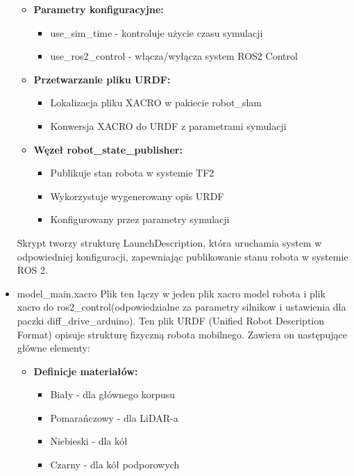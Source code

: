 \documentclass[a4paper,twoside,12pt]{book}
\begin{document}
\begin{itemize}
	\begin{itemize}
		\item \textbf{Parametry konfiguracyjne:}
			\begin{itemize}
				\item use\_sim\_time - kontroluje użycie czasu symulacji
				\item use\_ros2\_control - włącza/wyłącza system ROS2 Control
			\end{itemize}
		
		\item \textbf{Przetwarzanie pliku URDF:}
			\begin{itemize}
				\item Lokalizacja pliku XACRO w pakiecie robot\_slam
				\item Konwersja XACRO do URDF z parametrami symulacji
			\end{itemize}
		
		\item \textbf{Węzeł robot\_state\_publisher:}
			\begin{itemize}
				\item Publikuje stan robota w systemie TF2
				\item Wykorzystuje wygenerowany opis URDF
				\item Konfigurowany przez parametry symulacji
			\end{itemize}
	\end{itemize}

	Skrypt tworzy strukturę LaunchDescription, która uruchamia system w odpowiedniej konfiguracji, zapewniając publikowanie stanu robota w systemie ROS 2.
	\newpage
	\item model\_main.xacro
	Plik ten łączy w jeden plik xacro model robota i plik xacro do ros2\_control(odpowiedzialne za parametry silnikow i ustawienia dla paczki diff\_drive\_arduino).
	Ten plik URDF (Unified Robot Description Format) opisuje strukturę fizyczną robota mobilnego. Zawiera on następujące główne elementy:

	\begin{itemize}
	\item \textbf{Definicje materiałów:}
		\begin{itemize}
		\item Biały - dla głównego korpusu
		\item Pomarańczowy - dla LiDAR-a
		\item Niebieski - dla kół
		\item Czarny - dla kół podporowych
		\end{itemize}


\end{itemize}
\end{itemize}
\end{document}
